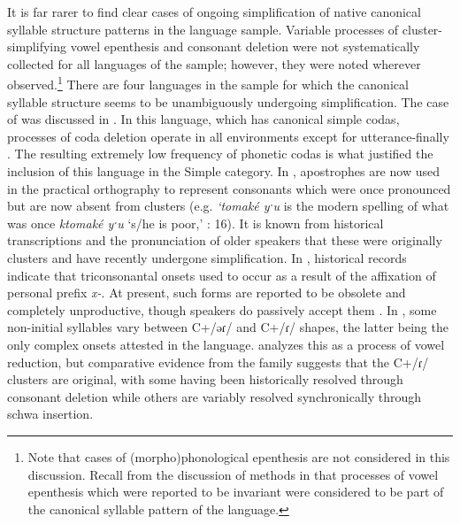   It is far rarer to find clear cases of ongoing simplification of native canonical syllable structure patterns in the language sample. Variable processes of cluster-simplifying vowel epenthesis and consonant deletion were not systematically collected for all languages of the sample; however, they were noted wherever observed.\footnote{{Note that cases of (morpho)phonological epenthesis are not considered in this discussion. Recall from the discussion of methods in  that processes of vowel epenthesis which were reported to be invariant were considered to be part of the canonical syllable pattern of the language.}} There are four languages in the sample for which the canonical syllable structure seems to be unambiguously undergoing simplification. The case of  was discussed in . In this language, which has canonical simple codas, processes of coda deletion operate in all environments except for utterance-finally \citep[22--24]{Yumitani1998}. The resulting extremely low frequency of phonetic codas is what justified the inclusion of this language in the Simple category. In , apostrophes are now used in the practical orthography to represent consonants which were once pronounced but are now absent from clusters (e.g. \textit{‘tomak\'{e} yˑu} is the modern spelling of what was once \textit{ktomak\'{e} yˑu} ‘s/he is poor,’ \citealt{Leavitt1996}: 16). It is known from historical transcriptions and the pronunciation of older speakers that these were originally clusters and have recently undergone simplification. In , historical records indicate that triconsonantal onsets used to occur as a result of the affixation of personal prefix \textit{x-}. At present, such forms are reported to be obsolete and completely unproductive, though speakers do passively accept them \citep[66]{Cerrón-Palomino2006}. In , some non-initial syllables vary between C+/əɾ/ and C+/ɾ/ shapes, the latter being the only complex onsets attested in the language. \citet[30--32]{VanBreugel2008} analyzes this as a process of vowel reduction, but comparative evidence from the family suggests that the C+/ɾ/ clusters are original, with some having been historically resolved through consonant deletion while others are variably resolved synchronically through schwa insertion.

